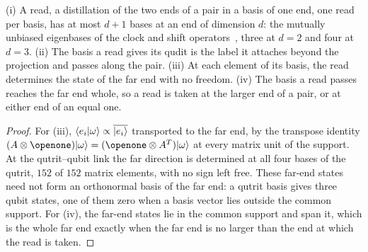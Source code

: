 \begin{corollary}[A read]
\label{cor:s-read}
(i) A read, a distillation of the two ends of a pair in a basis of one end, one read per basis, has at most $d+1$ bases at an end of dimension $d$: the mutually unbiased eigenbases of the clock and shift operators~\cite{wootters1989}, three at $d=2$ and four at $d=3$. (ii) The basis a read gives its qudit is the label it attaches beyond the projection and passes along the pair. (iii) At each element of its basis, the read determines the state of the far end with no freedom. (iv) The basis a read passes reaches the far end whole, so a read is taken at the larger end of a pair, or at either end of an equal one.
\end{corollary}
\begin{proof}
For (iii), $\langle e_{i}|\omega\rangle\propto\overline{|e_{i}\rangle}$ transported to the far end, by the transpose identity $(A\otimes\openone)\ket{\omega}=(\openone\otimes A^{T})\ket{\omega}$ at every matrix unit of the support. At the qutrit--qubit link the far direction is determined at all four bases of the qutrit, $152$ of $152$ matrix elements, with no sign left free. These far-end states need not form an orthonormal basis of the far end: a qutrit basis gives three qubit states, one of them zero when a basis vector lies outside the common support. For (iv), the far-end states lie in the common support and span it, which is the whole far end exactly when the far end is no larger than the end at which the read is taken.
\end{proof}

